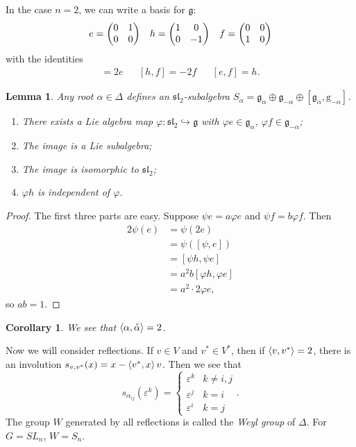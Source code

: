 \documentclass[leqno, openany]{memoir}
\DeclarePairedDelimiter{\gen}{\langle}{\rangle}
\newtheorem{cor}[thm]{Corollary}
\newtheorem{lem}[thm]{Lemma}
\theoremstyle{definition}
\theoremstyle{remark}
\theoremstyle{plain}
\theoremstyle{definition}
\theoremstyle{remark}
\newcommand{\ep}{\varepsilon}
\newcommand{\mf}[1]{\mathfrak{#1}}
\newcommand{\mr}[1]{\mathrm{#1}}
\begin{document}
In the case $n = 2$, we can write a basis for $\mf{g}$:
\begin{align*}
    e = \mqty(0 & 1 \\ 0 & 0) & & h = \mqty(\dmat[0]{1,-1}) & & f = \mqty(0 & 0 \\ 1 & 0)
\end{align*}
with the identities
\begin{align*}
    [h,e] = 2e & & [h,f] = -2f & & [e,f] = h.
\end{align*}

\begin{lem}
    Any root $\alpha \in \Delta$ defines an $\mf{sl}_2$-subalgebra $S_{\alpha} = \mf{g}_{\alpha} \oplus \mf{g}_{-\alpha} \oplus [\mf{g}_{\alpha}, \mr{g}_{-\alpha}]$.
    \begin{enumerate}
        \item There exists a Lie algebra map $\varphi: \mf{sl}_2 \hookrightarrow \mf{g}$ with $\varphi e \in \mf{g}_{\alpha}$, $\varphi f \in \mf{g}_{-\alpha}$;
        \item The image is a Lie subalgebra;
        \item The image is isomorphic to $\mf{sl}_2$;
        \item $\varphi h$ is independent of $\varphi$.
    \end{enumerate}
\end{lem}

\begin{proof}
    The first three parts are easy. Suppose $\psi e = a \varphi e$ and $\psi f = b \varphi f$. Then 
    \begin{align*}
        2 \psi(e) &= \psi(2e) \\
                  &= \psi([\psi, e]) \\
                  &= [\psi h, \psi e] \\
                  &= a^2 b [\varphi h, \varphi e] \\
                  &= a^2 \cdot 2 \varphi e,
    \end{align*}
    so $ab = 1$.
\end{proof}

\begin{cor}
    We see that $\gen{\alpha, \check{\alpha}} = 2$.
\end{cor}

Now we will consider reflections. If $v \in V$ and $v^* \in V^*$, then if $\gen{v, v^*} = 2$, there is an involution $s_{v,v^*}(x) = x - \ev{v^*, x} v$. Then we see that
\[ s_{\alpha_{ij}} (\ep^k) = \begin{cases}
    \ep^k & k \neq i,j \\
    \ep^j & k = i \\
    \ep^i & k = j
\end{cases}. \]
The group $W$ generated by all reflections is called the \textit{Weyl group} of $\Delta$. For $G = SL_n$, $W = S_n$.
\end{document}

